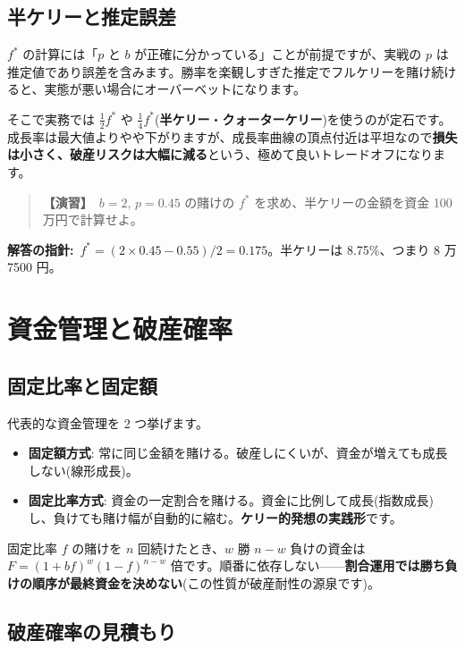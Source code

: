 \documentclass{article}
\begin{document}
\subsection{半ケリーと推定誤差}

\(f^*\) の計算には「\(p\) と \(b\) が正確に分かっている」ことが前提ですが、実戦の \(p\) は推定値であり誤差を含みます。勝率を楽観しすぎた推定でフルケリーを賭け続けると、実態が悪い場合にオーバーベットになります。

そこで実務では \(\frac{1}{2} f^*\) や \(\frac{1}{4} f^*\)(\textbf{半ケリー}・\textbf{クォーターケリー})を使うのが定石です。成長率は最大値よりやや下がりますが、成長率曲線の頂点付近は平坦なので\textbf{損失は小さく、破産リスクは大幅に減る}という、極めて良いトレードオフになります。

\begin{quote}
\textbf{【演習】}\ \(b = 2\), \(p = 0.45\) の賭けの \(f^*\) を求め、半ケリーの金額を資金 100 万円で計算せよ。
\end{quote}

\textbf{解答の指針:}\ \(f^* = (2 \times 0.45 - 0.55)/2 = 0.175\)。半ケリーは 8.75\%、つまり 8 万 7500 円。

\section{資金管理と破産確率}

\subsection{固定比率と固定額}

代表的な資金管理を 2 つ挙げます。

\begin{itemize}
\item \textbf{固定額方式}: 常に同じ金額を賭ける。破産しにくいが、資金が増えても成長しない(線形成長)。
\item \textbf{固定比率方式}: 資金の一定割合を賭ける。資金に比例して成長(指数成長)し、負けても賭け幅が自動的に縮む。\textbf{ケリー的発想の実践形}です。
\end{itemize}

固定比率 \(f\) の賭けを \(n\) 回続けたとき、\(w\) 勝 \(n - w\) 負けの資金は \(F = (1 + bf)^w (1 - f)^{n - w}\) 倍です。順番に依存しない——\textbf{割合運用では勝ち負けの順序が最終資金を決めない}(この性質が破産耐性の源泉です)。

\subsection{破産確率の見積もり}
\end{document}
